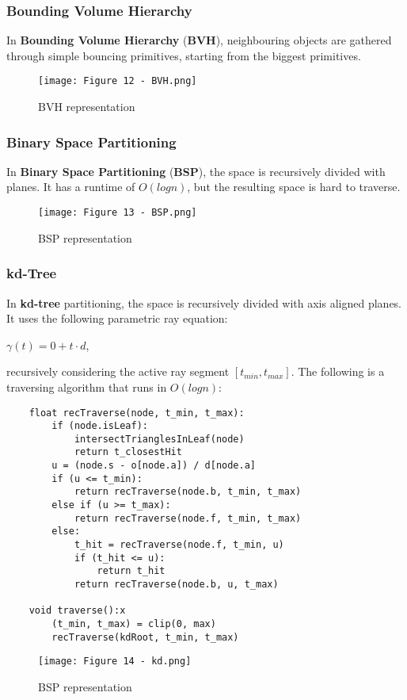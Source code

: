 \documentclass{article}
\begin{document}
\subsubsection{Bounding Volume Hierarchy}
In \textbf{Bounding Volume Hierarchy} (\textbf{BVH}), neighbouring objects are gathered through simple bouncing primitives, starting from the biggest primitives.
\begin{figure}[H]
    \centering
    \texttt{[image: Figure 12 - BVH.png]}
    \caption{BVH representation}
\end{figure}
\subsubsection{Binary Space Partitioning}
In \textbf{Binary Space Partitioning} (\textbf{BSP}), the space is recursively divided with planes. It has a runtime of $O(logn)$, but the resulting space is hard to traverse.
\begin{figure}[H]
    \centering
    \texttt{[image: Figure 13 - BSP.png]}
    \caption{BSP representation}
\end{figure}
\subsubsection{kd-Tree}
In \textbf{kd-tree} partitioning, the space is recursively divided with axis aligned planes. It uses the following parametric ray equation:
\begin{center}
    $ \gamma(t) = 0 + t \cdot d$,
\end{center}
recursively considering the active ray segment $[t_{min}, t_{max}]$. The following is a traversing algorithm that runs in $O(logn)$:
\begin{verbatim}
    float recTraverse(node, t_min, t_max):
        if (node.isLeaf):
            intersectTrianglesInLeaf(node)
            return t_closestHit
        u = (node.s - o[node.a]) / d[node.a]
        if (u <= t_min):
            return recTraverse(node.b, t_min, t_max)
        else if (u >= t_max):
            return recTraverse(node.f, t_min, t_max)
        else:
            t_hit = recTraverse(node.f, t_min, u)
            if (t_hit <= u):
                return t_hit
            return recTraverse(node.b, u, t_max)
            
    void traverse():x
        (t_min, t_max) = clip(0, max)
        recTraverse(kdRoot, t_min, t_max)
\end{verbatim}
\begin{figure}[H]
    \centering
    \texttt{[image: Figure 14 - kd.png]}
    \caption{BSP representation}
\end{figure}
\newpage
\end{document}
